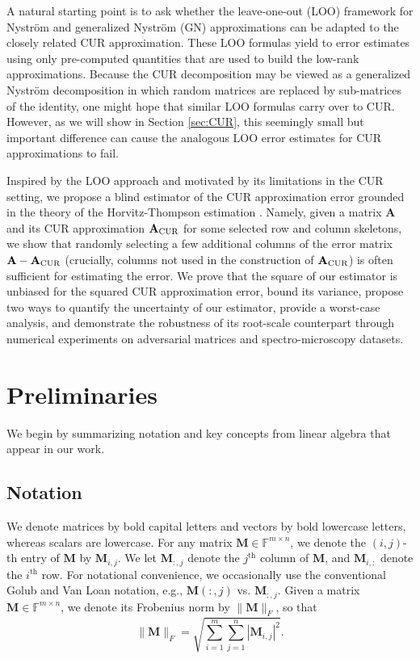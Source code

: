 \documentclass[11pt]{article}
\newcommand{\GN}{generalized Nyström}
\newcommand{\curX}{\mathbf{A}_{\textup{CUR}}}
\newcommand{\F}{\mathbb{F}}
\newcommand{\jcol}[2]{#1_{:, #2}} %
\newcommand{\jrow}[2]{#1_{#2, :}} %
\begin{document}
A natural starting point is to ask whether the leave-one-out (LOO) framework for Nyström \cite{EpperlyTropp_VarianceEst2024} and generalized Nyström (GN) \cite{LazPearPrit26} approximations can be adapted to the closely related CUR approximation.
These LOO formulas yield to error estimates using only pre-computed quantities that are used to build the low-rank approximations.
Because the CUR decomposition may be viewed as a \GN{} decomposition in which random matrices are replaced by sub-matrices of the identity, one might hope that similar LOO formulas carry over to CUR.
However, as we will show in Section \ref{sec:CUR}, this seemingly small but important difference can cause the analogous LOO error estimates for CUR approximations to fail.

Inspired by the LOO approach and motivated by its limitations in the CUR setting, we propose a blind estimator of the CUR approximation error grounded in the theory of the Horvitz-Thompson estimation \cite{horvitz1952generalization}.
Namely, given a matrix $\mathbf{A}$ and its CUR approximation $\curX$ for some selected row and column skeletons, we show that randomly selecting a few additional columns of the error matrix $\mathbf{A}-\curX$ (crucially, columns not used in the construction of $\curX$) is often sufficient for estimating the error.
We prove that the square of our estimator is unbiased for the squared CUR approximation error, bound its variance, propose two ways to quantify the uncertainty of our estimator, provide a worst-case analysis, and demonstrate the robustness of its root-scale counterpart through numerical experiments on adversarial matrices and spectro-microscopy datasets.


\section{Preliminaries}


We begin by summarizing notation and key concepts from linear algebra that appear in our work.

\subsection{Notation}
\label{sec:notation}

We denote matrices by bold capital letters and vectors by bold lowercase letters, whereas scalars are lowercase.
For any matrix $\mathbf{M} \in \F^{m \times n}$, we  denote the $(i,j)$-th entry of $\mathbf{M}$ by $\mathbf{M}_{i,j}$.
We let $\jcol{\mathbf{M}}{j}$ denote the $j^\text{th}$ column of $\mathbf{M}$, and $\jrow{\mathbf{M}}{i}$ denote the $i^\text{th}$ row.
For notational convenience, we occasionally use the conventional Golub and Van Loan notation, e.g., $\mathbf{M}(:,j)$ vs. $\mathbf{M}_{:,j}$.
Given a matrix $\mathbf{M} \in \F^{m \times n}$,
we denote its
Frobenius norm by $\| \mathbf{M} \|_F$, so that
$$ \| \mathbf{M} \|_F = \sqrt{\sum_{i=1}^m \sum_{j=1}^n |\mathbf{M}_{i,j}|^2}.$$
\end{document}
